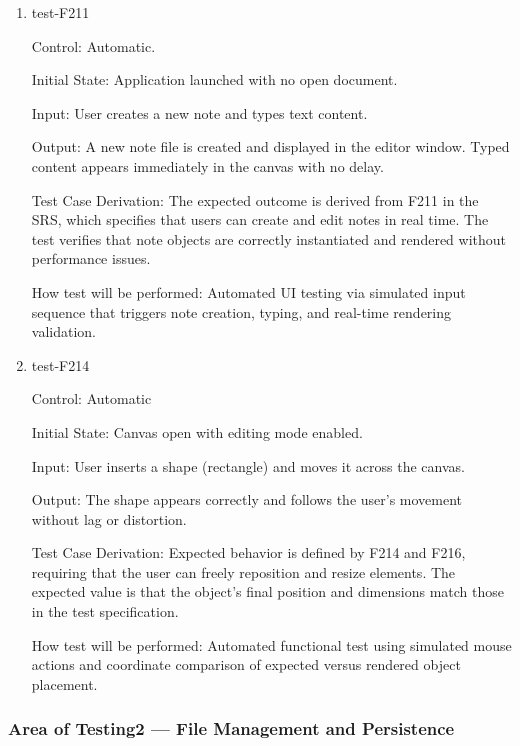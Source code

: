 \documentclass[12pt, titlepage]{article}
\begin{document}
\begin{enumerate}

\item{test-F211\\}

Control: Automatic.

Initial State: Application launched with no open document.

Input: User creates a new note and types text content.

Output: 
A new note file is created and displayed in the editor window. Typed content appears 
immediately in the canvas with no delay.

Test Case Derivation: 
The expected outcome is derived from F211 in the SRS, which specifies that users can create and edit notes in real time.  
The test verifies that note objects are correctly instantiated and rendered without performance issues.

How test will be performed: Automated UI testing via simulated input sequence that triggers note creation, typing, 
and real-time rendering validation.

\item{test-F214\\}

Control: Automatic

Initial State: Canvas open with editing mode enabled.

Input: User inserts a shape (rectangle) and moves it across the canvas.

Output: 
The shape appears correctly and follows the user’s movement without lag or distortion.

Test Case Derivation: 
Expected behavior is defined by F214 and F216, requiring that the user can freely reposition and resize elements.  
The expected value is that the object’s final position and dimensions match those in the test specification.

How test will be performed: Automated functional test using simulated mouse actions and coordinate comparison of 
expected versus rendered object placement.

\end{enumerate}

\subsubsection{Area of Testing2 — File Management and Persistence}
\end{document}
